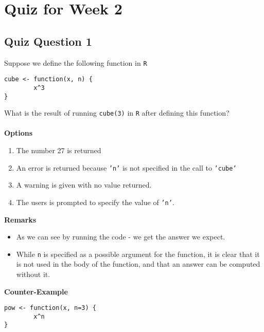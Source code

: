 \documentclass[]{article}
\begin{document}
\tableofcontents
\newpage
\large
\section*{Quiz for Week 2}

\newpage

\subsection*{Quiz Question 1}%
Suppose we define the following function in \texttt{R}
\begin{framed}
\begin{verbatim}
cube <- function(x, n) {
        x^3
}
\end{verbatim}
\end{framed}
\noindent What is the result of running
\texttt{cube(3)}
in \texttt{R} after defining this function?\\ \\
\textbf{Options}
\begin{enumerate}
\item The number 27 is returned
\item An error is returned because \texttt{'n'} is not specified in the call to \texttt{'cube'}
\item A warning is given with no value returned.
\item The users is prompted to specify the value of \texttt{'n'}.
\end{enumerate}
\bigskip
\textbf{Remarks}
\begin{itemize}
\item As we can see by running the code - we get the answer we expect.
\item While \texttt{n} is specified as a possible argument for the function, it is clear that it is not used in the body of the function, and that an answer can be computed without it.
\end{itemize}
\newpage

\textbf{Counter-Example}
\begin{framed}
\begin{verbatim}
pow <- function(x, n=3) {
        x^n
}
\end{verbatim}
\end{framed}

\newpage
\end{document}
